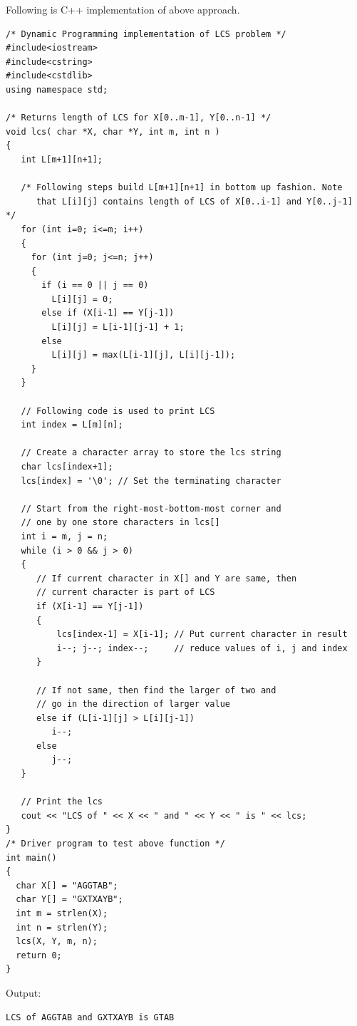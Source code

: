 Following is C++ implementation of above approach.
\begin{lstlisting}[style=raycppnewsnippet]
/* Dynamic Programming implementation of LCS problem */
#include<iostream>
#include<cstring>
#include<cstdlib>
using namespace std;
 
/* Returns length of LCS for X[0..m-1], Y[0..n-1] */
void lcs( char *X, char *Y, int m, int n )
{
   int L[m+1][n+1];
 
   /* Following steps build L[m+1][n+1] in bottom up fashion. Note
      that L[i][j] contains length of LCS of X[0..i-1] and Y[0..j-1] */
   for (int i=0; i<=m; i++)
   {
     for (int j=0; j<=n; j++)
     {
       if (i == 0 || j == 0)
         L[i][j] = 0;
       else if (X[i-1] == Y[j-1])
         L[i][j] = L[i-1][j-1] + 1;
       else
         L[i][j] = max(L[i-1][j], L[i][j-1]);
     }
   }
 
   // Following code is used to print LCS
   int index = L[m][n];
 
   // Create a character array to store the lcs string
   char lcs[index+1];
   lcs[index] = '\0'; // Set the terminating character
   
   // Start from the right-most-bottom-most corner and
   // one by one store characters in lcs[]
   int i = m, j = n;
   while (i > 0 && j > 0)
   {
      // If current character in X[] and Y are same, then
      // current character is part of LCS
      if (X[i-1] == Y[j-1])
      {
          lcs[index-1] = X[i-1]; // Put current character in result
          i--; j--; index--;     // reduce values of i, j and index
      }
 
      // If not same, then find the larger of two and
      // go in the direction of larger value
      else if (L[i-1][j] > L[i][j-1])
         i--;
      else
         j--;
   }
 
   // Print the lcs
   cout << "LCS of " << X << " and " << Y << " is " << lcs;
}
/* Driver program to test above function */
int main()
{
  char X[] = "AGGTAB";
  char Y[] = "GXTXAYB";
  int m = strlen(X);
  int n = strlen(Y);
  lcs(X, Y, m, n);
  return 0;
}
\end{lstlisting}
Output:
\begin{lstlisting}[style=rayio]
LCS of AGGTAB and GXTXAYB is GTAB
\end{lstlisting}


